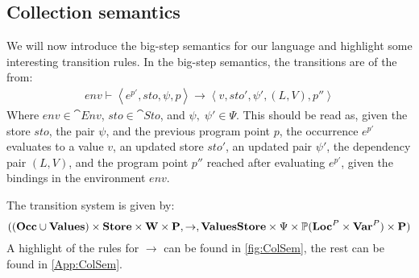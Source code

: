 \documentclass[../../master.tex]{subfiles}
\begin{document}
\subsection{Collection semantics}\label{sec:sem}
We will now introduce the big-step semantics for our language and highlight some interesting transition rules.
In the big-step semantics, the transitions are of the from:
\begin{align*}
env\vdash\left\langle e^{p'},sto,\psi,p\right\rangle\rightarrow\left\langle v,sto',\psi',(L,V),p''\right\rangle
\end{align*}
Where $env\in\cat{Env}$, $sto\in\cat{Sto}$, and $\psi,\;\psi'\in\Psi$.
This should be read as, given the store $sto$, the pair $\psi$, and the previous program point $p$, the occurrence $e^{p'}$ evaluates to a value $v$, an updated store $sto'$, an updated pair $\psi'$, the dependency pair $(L,V)$, and the program point $p''$ reached after evaluating $e^{p'}$, given the bindings in the environment $env$.

The transition system is given by:
$$((\textbf{Occ}\cup\textbf{Values})\times\textbf{Store}\times\textbf{W}\times\textbf{P},\rightarrow,\textbf{Values}\textbf{Store}\times\Psi\times\mathbb{P}(\textbf{Loc}^P\times\textbf{Var}^P)\times\textbf{P})$$
A highlight of the rules for $\rightarrow$ can be found in \cref{fig:ColSem}, the rest can be found in \cref{App:ColSem}.
\end{document}
